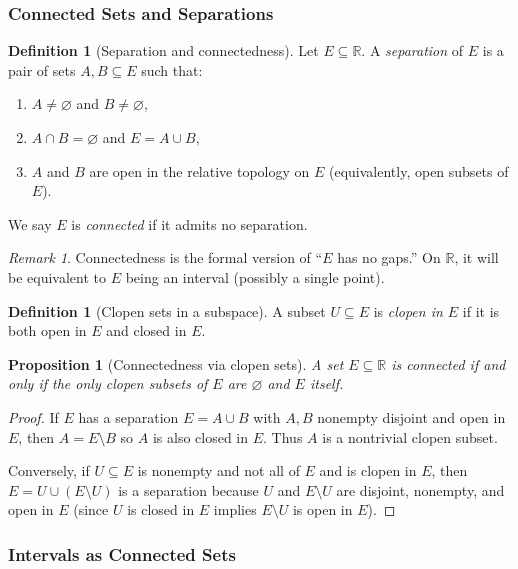 \documentclass[12pt]{article}
\numberwithin{equation}{section}
\newcommand{\RR}{\mathbb{R}}
\let\emptyset\varnothing
\theoremstyle{plain}
\newtheorem{proposition}[theorem]{Proposition}
\theoremstyle{definition}
\newtheorem{definition}[theorem]{Definition}
\theoremstyle{remark}
\newtheorem{remark}[theorem]{Remark}
\begin{document}
\subsubsection{Connected Sets and Separations}

\begin{definition}[Separation and connectedness]\label{def:connected}
Let $E\subseteq\RR$.
A \emph{separation} of $E$ is a pair of sets $A,B\subseteq E$ such that:
\begin{enumerate}[label=(\roman*)]
\item $A\neq\emptyset$ and $B\neq\emptyset$,
\item $A\cap B=\emptyset$ and $E=A\cup B$,
\item $A$ and $B$ are open in the relative topology on $E$ (equivalently, open subsets of $E$).
\end{enumerate}
We say $E$ is \emph{connected} if it admits no separation.
\end{definition}

\begin{remark}
Connectedness is the formal version of ``$E$ has no gaps.'' On $\RR$, it will be equivalent to $E$ being an interval (possibly a single point).
\end{remark}

\begin{definition}[Clopen sets in a subspace]
A subset $U\subseteq E$ is \emph{clopen in $E$} if it is both open in $E$ and closed in $E$.
\end{definition}

\begin{proposition}[Connectedness via clopen sets]\label{prop:clopen}
A set $E\subseteq\RR$ is connected if and only if the only clopen subsets of $E$ are $\emptyset$ and $E$ itself.
\end{proposition}

\begin{proof}
If $E$ has a separation $E=A\cup B$ with $A,B$ nonempty disjoint and open in $E$, then $A=E\setminus B$ so $A$ is also closed in $E$.
Thus $A$ is a nontrivial clopen subset.

Conversely, if $U\subseteq E$ is nonempty and not all of $E$ and is clopen in $E$, then $E=U\cup(E\setminus U)$ is a separation
because $U$ and $E\setminus U$ are disjoint, nonempty, and open in $E$ (since $U$ is closed in $E$ implies $E\setminus U$ is open in $E$).
\end{proof}

\subsubsection{Intervals as Connected Sets}
\end{document}
